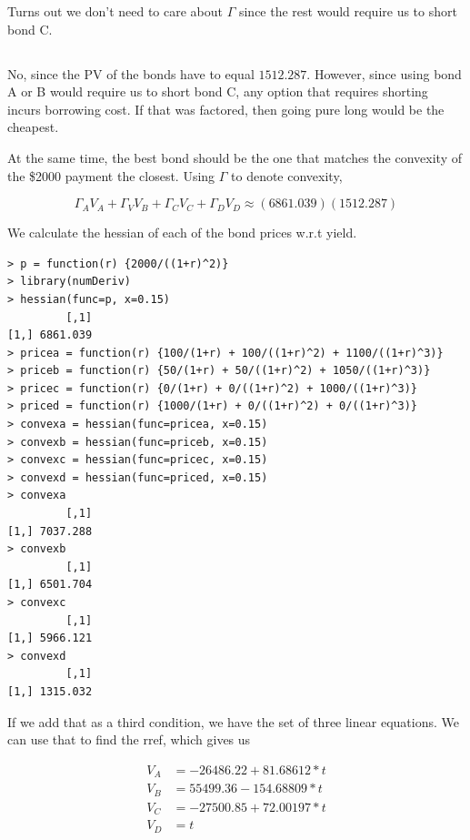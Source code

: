 \documentclass[11pt]{scrartcl}
\begin{document}
Turns out we don't need to care about $\Gamma$ since the rest would require us to short bond C.

\subsection{}

No, since the PV of the bonds have to equal $1512.287$. However, since using bond A or B would require us to short bond C, any option that requires shorting incurs borrowing cost. If that was factored, then going pure long would be the cheapest.

At the same time, the best bond should be the one that matches the convexity of the \$2000 payment the closest. Using $\Gamma$ to denote convexity,

\[\Gamma_A V_A + \Gamma_V V_B + \Gamma_C V_C + \Gamma_D V_D \approx (6861.039)(1512.287)\]

We calculate the hessian of each of the bond prices w.r.t yield.

\begin{lstlisting}
> p = function(r) {2000/((1+r)^2)}
> library(numDeriv)
> hessian(func=p, x=0.15)
         [,1]
[1,] 6861.039
> pricea = function(r) {100/(1+r) + 100/((1+r)^2) + 1100/((1+r)^3)}
> priceb = function(r) {50/(1+r) + 50/((1+r)^2) + 1050/((1+r)^3)}
> pricec = function(r) {0/(1+r) + 0/((1+r)^2) + 1000/((1+r)^3)}
> priced = function(r) {1000/(1+r) + 0/((1+r)^2) + 0/((1+r)^3)}
> convexa = hessian(func=pricea, x=0.15)
> convexb = hessian(func=priceb, x=0.15)
> convexc = hessian(func=pricec, x=0.15)
> convexd = hessian(func=priced, x=0.15)
> convexa
         [,1]
[1,] 7037.288
> convexb
         [,1]
[1,] 6501.704
> convexc
         [,1]
[1,] 5966.121
> convexd
         [,1]
[1,] 1315.032
\end{lstlisting}

If we add that as a third condition, we have the set of three linear equations. We can use that to find the rref, which gives us

\begin{align*}
V_A &= -26486.22 + 81.68612*t \\
V_B &= 55499.36 - 154.68809*t \\
V_C &= -27500.85 + 72.00197*t \\
V_D &= t
\end{align*}
\end{document}
